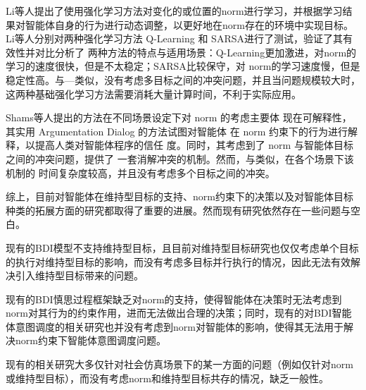 Li等人\cite{DBLP:conf/atal/LiMFL15}提出了使用强化学习方法对变化的或位置的norm进行学习，并根据学习结果对智能体自身的行为进行动态调整，以更好地在norm存在的环境中实现目标。Li等人\cite{DBLP:conf/atal/LiMFL15}分别对两种强化学习方法 Q-Learning 和 SARSA\cite{Sutton2005ReinforcementLA}进行了测试，验证了其有效性并对比分析了 两种方法的特点与适用场景：Q-Learning更加激进，对norm的学习的速度很快，但是不太稳定；SARSA比较保守，对 norm的学习速度慢，但是稳定性高。与—类似，\cite{DBLP:conf/atal/LiMFL15}没有考虑多目标之间的冲突问题，并且当问题规模较大时，这两种基础强化学习方法需要消耗大量计算时间，不利于实际应用。

Shams等人\cite{DBLP:conf/ijcai/ShamsVOP16,DBLP:journals/taas/ShamsVOP20,DBLP:conf/atal/ShamsVPV15}提出的方法在不同场景设定下对 norm 的考虑主要体 现在可解释性，其实用 Argumentation Dialog 的方法试图对智能体 在 norm 约束下的行为进行解释，以提高人类对智能体程序的信任 度。同时，其考虑到了 norm 与智能体目标之间的冲突问题，提供了 一套消解冲突的机制。然而，与\cite{DBLP:conf/atal/LiMFL15}类似，在各个场景下该机制的 时间复杂度较高，并且没有考虑多个目标之间的冲突。


综上，目前对智能体在维持型目标的支持、norm约束下的决策以及对智能体目标种类的拓展方面的研究都取得了重要的进展。然而现有研究依然存在一些问题与空白。

现有的BDI模型不支持维持型目标，且目前对维持型目标研究也仅仅考虑单个目标的执行对维持型目标的影响，而没有考虑多目标并行执行的情况，因此无法有效解决引入维持型目标带来的问题。

现有的BDI慎思过程框架缺乏对norm的支持，使得智能体在决策时无法考虑到norm对其行为的约束作用，进而无法做出合理的决策；同时，现有的对BDI智能体意图调度的相关研究也并没有考虑到norm对智能体的影响，使得其无法用于解决norm约束下智能体意图调度问题。

现有的相关研究大多仅针对社会仿真场景下的某一方面的问题（例如仅针对norm或维持型目标），而没有考虑norm和维持型目标共存的情况，缺乏一般性。
